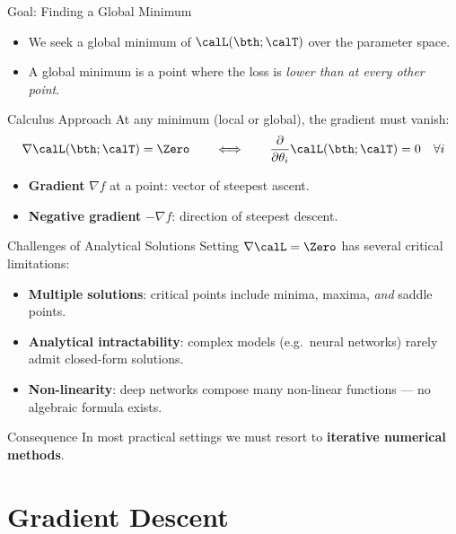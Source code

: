 \begin{frame}{Goal: Finding a Global Minimum}
  \begin{itemize}
    \item We seek a \textcolor{MainBlue}{global minimum} of $\calL(\bth;\calT)$
          over the parameter space.
    \item A global minimum is a point where the loss is \emph{lower than at every other point}.
  \end{itemize}
  \begin{block}{Calculus Approach}
    At any minimum (local or global), the gradient must vanish:
    \[
      \nabla\calL(\bth;\calT) = \Zero
      \qquad\Longleftrightarrow\qquad
      \frac{\partial}{\partial\theta_i}\calL(\bth;\calT) = 0
      \quad\forall i
    \]
  \end{block}
  \begin{itemize}
    \item \textbf{Gradient} $\nabla f$ at a point: vector of steepest ascent.
    \item \textbf{Negative gradient} $-\nabla f$: direction of steepest descent.
  \end{itemize}
\end{frame}

\begin{frame}{Challenges of Analytical Solutions}
  Setting $\nabla\calL = \Zero$ has several \textcolor{AlertRed}{critical limitations}:
  \begin{itemize}
    \item \textbf{Multiple solutions}: critical points include minima, maxima, \emph{and} saddle points.
    \item \textbf{Analytical intractability}: complex models (e.g.\ neural networks)
          rarely admit closed-form solutions.
    \item \textbf{Non-linearity}: deep networks compose many non-linear functions —
          no algebraic formula exists.
  \end{itemize}
  \begin{alertblock}{Consequence}
    In most practical settings we must resort to \textbf{iterative numerical methods}.
  \end{alertblock}
\end{frame}

\section{Gradient Descent}

